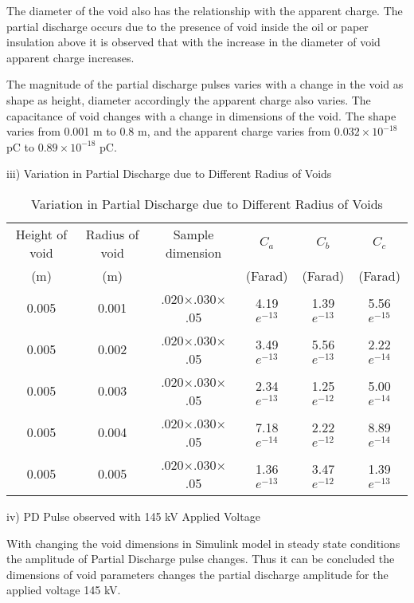 The diameter of the void also has the relationship with the apparent charge. The partial discharge occurs due to the presence of void inside the oil or paper insulation above it is observed that with the increase in the diameter of void apparent charge increases. 

The magnitude of the partial discharge pulses varies with a change in the void as shape as height, diameter accordingly the apparent charge also varies. The capacitance of void changes with a change in dimensions of the void. The shape varies from 0.001 m to 0.8 m, and the apparent charge varies from $0.032 \times 10^{-18}$ pC to $0.89 \times 10^{-18}$ pC.

iii)	Variation in Partial Discharge due to Different Radius of Voids

\begin{table}[h!]
\caption{Variation in Partial Discharge due to Different Radius of Voids}
\label{table:Variation in Partial Discharge due to Different Radius of Voids}
\centering
\begin{tabular}{|c|c|c|c|c|c|}
\hline 
Height of void 	&Radius of void &Sample dimension 				&$C_a$			&$C_b$			&$C_c$         \\ 
	(m)			&	(m) 		&								&(Farad) 		&(Farad) 		&(Farad)       \\ \hline \hline
0.005			&0.001			&.020$\times$.030$\times$.05 	&4.19$e^{-13}$	&1.39$e^{-13}$	&5.56$e^{-15}$ \\ \hline
0.005			&0.002			&.020$\times$.030$\times$.05 	&3.49$e^{-13}$	&5.56$e^{-13}$	&2.22$e^{-14}$ \\ \hline
0.005			&0.003			&.020$\times$.030$\times$.05 	&2.34$e^{-13}$	&1.25$e^{-12}$	&5.00$e^{-14}$ \\ \hline
0.005			&0.004			&.020$\times$.030$\times$.05 	&7.18$e^{-14}$	&2.22$e^{-12}$	&8.89$e^{-14}$ \\ \hline
0.005			&0.005			&.020$\times$.030$\times$.05 	&1.36$e^{-13}$	&3.47$e^{-12}$	&1.39$e^{-13}$ \\ \hline
\end{tabular} 
\end{table}

iv) PD Pulse observed with 145 kV Applied Voltage

With changing the void dimensions in Simulink model in steady state conditions the amplitude of Partial Discharge pulse changes. Thus it can be concluded the dimensions of void parameters changes the partial discharge amplitude for the applied voltage 145 kV. 

